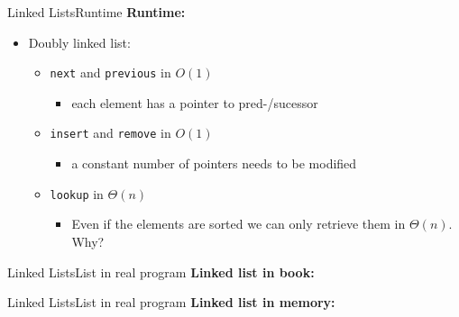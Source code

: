 \begin{frame}{Linked Lists}{Runtime}
  \textbf{Runtime:}
  \begin{itemize}
  \item<2->
    Doubly linked list:
    \begin{itemize}
    \item<3-> {\color{Mittel-Blau}\texttt{next}} and {\color{Mittel-Blau}\texttt{previous}} in $O(1)$
      \begin{itemize}
      \item<4-> each element has a pointer to pred-/sucessor
      \end{itemize}
    \item<5-> {\color{Mittel-Blau}\texttt{insert}} and {\color{Mittel-Blau}\texttt{remove}} in $O(1)$
      \begin{itemize}
      \item<6-> a constant number of pointers needs to be modified
      \end{itemize}
    \item<7-> {\color{Mittel-Blau}\texttt{lookup}} in $\Theta(n)$
      \begin{itemize}
      \item<8-> Even if the elements are sorted we can only retrieve them in $\Theta(n)$.\\ Why?
      \end{itemize}
    \end{itemize}
  \end{itemize}  
\end{frame}


\begin{frame}{Linked Lists}{List in real program}
  \textbf{Linked list in book:}
  \vspace{-1.5em}
  \begin{flushleft}
    
  \end{flushleft}
\end{frame}


\begin{frame}{Linked Lists}{List in real program}
  \textbf{Linked list in memory:}
  \vspace{-1.5em}
  \begin{flushleft}
    
  \end{flushleft}
\end{frame}
